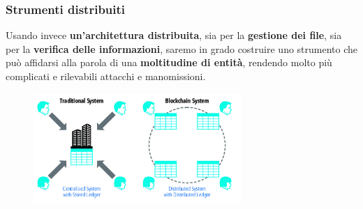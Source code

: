 \documentclass{beamer}
\begin{document}
\begin{frame}
	\frametitle{Strumenti distribuiti}
		Usando invece \textbf{un'architettura distribuita}, sia per la \textbf{gestione dei file},
		sia per la \textbf{verifica delle informazioni}, saremo in grado costruire uno strumento
		che può affidarsi alla parola di una \textbf{moltitudine di entità}, rendendo molto
		più complicati e rilevabili attacchi e manomissioni.
	\medskip
	\begin{figure}
		\includegraphics[width=0.70\textwidth]{dece.jpg}
	\end{figure}
\end{frame}
\end{document}
